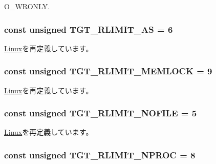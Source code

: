 O\_\-WRONLY. \hypertarget{classMipsLinux_a6e372e5f43e2da816e9bbf5088d89c21}{
\subsubsection[{TGT\_\-RLIMIT\_\-AS}]{\setlength{\rightskip}{0pt plus 5cm}const unsigned {\bf TGT\_\-RLIMIT\_\-AS} = 6}}
\label{classMipsLinux_a6e372e5f43e2da816e9bbf5088d89c21}


\hyperlink{classLinux_a6e372e5f43e2da816e9bbf5088d89c21}{Linux}を再定義しています。\hypertarget{classMipsLinux_acfa2b204cbb5bca2fbc2c1f15649aca2}{
\subsubsection[{TGT\_\-RLIMIT\_\-MEMLOCK}]{\setlength{\rightskip}{0pt plus 5cm}const unsigned {\bf TGT\_\-RLIMIT\_\-MEMLOCK} = 9}}
\label{classMipsLinux_acfa2b204cbb5bca2fbc2c1f15649aca2}


\hyperlink{classLinux_acfa2b204cbb5bca2fbc2c1f15649aca2}{Linux}を再定義しています。\hypertarget{classMipsLinux_a7eca1a56bf2a00dce74320c95a0b176e}{
\subsubsection[{TGT\_\-RLIMIT\_\-NOFILE}]{\setlength{\rightskip}{0pt plus 5cm}const unsigned {\bf TGT\_\-RLIMIT\_\-NOFILE} = 5}}
\label{classMipsLinux_a7eca1a56bf2a00dce74320c95a0b176e}


\hyperlink{classLinux_a7eca1a56bf2a00dce74320c95a0b176e}{Linux}を再定義しています。\hypertarget{classMipsLinux_af16b609dcc51ebef365e8258e28d777c}{
\subsubsection[{TGT\_\-RLIMIT\_\-NPROC}]{\setlength{\rightskip}{0pt plus 5cm}const unsigned {\bf TGT\_\-RLIMIT\_\-NPROC} = 8}}
\label{classMipsLinux_af16b609dcc51ebef365e8258e28d777c}


